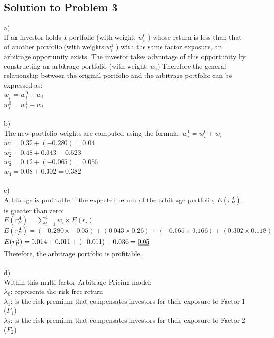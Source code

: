 \documentclass[12]{article}
\begin{document}
\subsection*{Solution to Problem 3}
a)\\
If an investor holds a portfolio (with weight: $w_i^0$ ) whose return is less than that of another portfolio (with weights:$w_i^1$ ) with the same factor exposure, an arbitrage opportunity exists. The investor takes advantage of this opportunity by constructing an arbitrage portfolio (with weight: $w_i$)
Therefore the  general relationship between the original portfolio and the arbitrage portfolio can be expressed as:\\
$w_i^1 = w_i^0 + w_i$\\
$w_i^0 = w_i^1 - w_i$\\
\\
b)\\
The new portfolio weights are computed using the formula: $w_i^1 = w_i^0 + w_i$\\
$w_1^1 = 0.32 + (-0.280) = 0.04$\\
$w_2^1 = 0.48 + 0.043 = 0.523$\\
$w_3^1 = 0.12 + (-0.065) = 0.055$\\
$w_4^1 = 0.08 + 0.302 = 0.382$\\
\\
c)\\
Arbitrage is profitable if the expected return of the arbitrage portfolio, $E(r_P^A)$, is greater than zero:\\
$E(r_P^A) = \sum_{i=1}^4 w_i \times E(r_i) $\\
$E(r_P^A) = (-0.280 \times -0.05) + (0.043 \times 0.26) + (-0.065 \times 0.166) + (0.302 \times 0.118) $\\
$E(r_P^A) =0.014 + 0.011 + (-0.011) + 0.036 = \uuline{0.05} $ \\
Therefore, the arbitrage portfolio is profitable.\\
\\
d)\\
Within this multi-factor Arbitrage Pricing model:\\
$\lambda_0$: represents the risk-free return\\
$\lambda_1$: is the risk premium that compensates investors for their exposure to Factor 1 ($F_1$)\\
$\lambda_2$: is the risk premium that compensates investors for their exposure to Factor 2 ($F_2$)\\
\\
\end{document}
